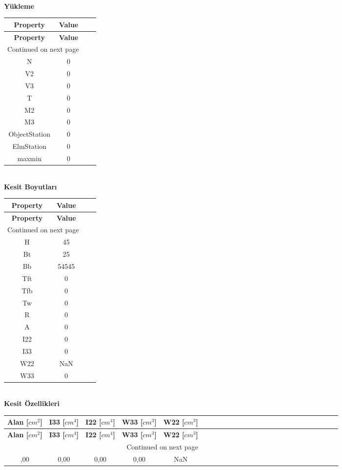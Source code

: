 \documentclass[12pt]{article}
\begin{document}
\\ {\Large \textbf{Yükleme}}\\ 
\begin{longtable}{|*{2}{c|c|}} 
\hline 
\textbf{Property} & 
\textbf{Value} 
 \\ \hline 
\endfirsthead 
\hline 
\textbf{Property} & \textbf{Value}\\ \hline 
\endhead 
\hline 
\multicolumn{2}{|r|}{{Continued on next page}} \\ \hline 
\endfoot 
\endlastfoot 
\hline 
N & 0 \\ 
\hline 
V2 & 0 \\ 
\hline 
V3 & 0 \\ 
\hline 
T & 0 \\ 
\hline 
M2 & 0 \\ 
\hline 
M3 & 0 \\ 
\hline 
ObjectStation & 0 \\ 
\hline 
ElmStation & 0 \\ 
\hline 
maxmin & 0 \\ 
\hline 
\end{longtable} 
\\ {\Large \textbf{Kesit Boyutları}}\\ 
\begin{longtable}{|*{2}{c|c|}} 
\hline 
\textbf{Property} & 
\textbf{Value} 
 \\ \hline 
\endfirsthead 
\hline 
\textbf{Property} & \textbf{Value}\\ \hline 
\endhead 
\hline 
\multicolumn{2}{|r|}{{Continued on next page}} \\ \hline 
\endfoot 
\endlastfoot 
\hline 
H & 45 \\ 
\hline 
Bt & 25 \\ 
\hline 
Bb & 54545 \\ 
\hline 
Tft & 0 \\ 
\hline 
Tfb & 0 \\ 
\hline 
Tw & 0 \\ 
\hline 
R & 0 \\ 
\hline 
A & 0 \\ 
\hline 
I22 & 0 \\ 
\hline 
I33 & 0 \\ 
\hline 
W22 & NaN \\ 
\hline 
W33 & 0 \\ 
\hline 
\end{longtable} 
\\ {\Large \textbf{Kesit Özellikleri}}\\ 
\begin{longtable}{|*{5}{c|c|c|c|c|}} 
\hline 
\textbf{Alan {[}$cm^2${]}} & 
\textbf{I33 {[}$cm^4${]}} & 
\textbf{I22 {[}$cm^4${]}} & 
\textbf{W33 {[}$cm^3${]}} & 
\textbf{W22 {[}$cm^3${]}} 
 \\ \hline 
\endfirsthead 
\hline 
\textbf{Alan {[}$cm^2${]}} & \textbf{I33 {[}$cm^4${]}} & \textbf{I22 {[}$cm^4${]}} & \textbf{W33 {[}$cm^3${]}} & \textbf{W22 {[}$cm^3${]}}\\ \hline 
\endhead 
\hline 
\multicolumn{5}{|r|}{{Continued on next page}} \\ \hline 
\endfoot 
\endlastfoot 
\hline 
0,00 & 0,00 & 0,00 & 0,00 & NaN \\ 
\hline 
\end{longtable} 
\end{document}
